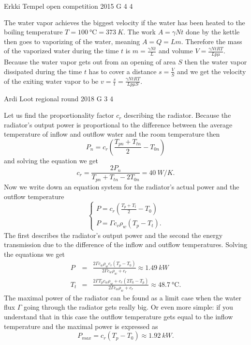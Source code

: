 \documentclass[11pt]{article}
\begin{document}
{Erkki Tempel} %
{open competition} %
{2015} %
{G 4} %
{4} %
{

\ifEngSolution
The water vapor achieves the biggest velocity if the water has been heated to the boiling temperature $T=\SI{100}{\celsius}=\SI{373}{K}$. The work $A=\gamma Nt$ done by the kettle then goes to vaporizing of the water, meaning $A=Q=Lm$. Therefore the mass of the vaporized water during the time $t$ is $m=\frac{\gamma Nt}{L}$ and volume $V=\frac{\gamma NtRT}{Lp\mu}$. Because the water vapor gets out from an opening of area $S$ then the water vapor dissipated during the time $t$ has to cover a distance $s=\frac{V}{S}$ and we get the velocity of the exiting water vapor to be $v=\frac{s}{t}=\frac{\gamma NtRT}{Lp\mu S}$.
\fi
}

{Ardi Loot} %
{regional round} %
{2018} %
{G 3} %
{4} %
{

\ifEngSolution
Let us find the proportionality factor $c_{r}$ describing the radiator. Because the radiator’s output power is proportional to the difference between the average temperature of inflow and outflow water and the room temperature then
\[
P_{n}=c_{r}\left(\frac{T_{pn}+T_{tn}}{2}-T_{0n}\right)
\]
and solving the equation we get
\[
c_{r}=\frac{2P_{n}}{T_{pn}+T_{tn}-2T_{0n}}=\SI{40}{W/K}.
\]
Now we write down an equation system for the radiator’s actual power and the outflow temperature
\[
\left\{ \begin{array}{c}
P=c_{r}\left(\frac{T_{p}+T_{t}}{2}-T_{0}\right)\\
P=\Gamma c_{v}\rho_{w}\left(T_{p}-T_{t}\right).
\end{array}\right.
\]
The first describes the radiator’s output power and the second the energy transmission due to the difference of the inflow and outflow temperatures. Solving the equations we get
\begin{eqnarray*}
P & = & \frac{2\Gamma c_{w}\rho_{w}c_{r}\left(T_{p}-T_{0}\right)}{2\Gamma c_{w}\rho_{w}+c_{r}}\approx\SI{1.49}{kW}\\
T_{t} & = & \frac{2\Gamma T_{p}c_{w}\rho_{w}+c_{r}\left(2T_{0}-T_{p}\right)}{2\Gamma c_{w}\rho_{w}+c_{r}}\approx\SI{48.7}{\celsius}.
\end{eqnarray*}
The maximal power of the radiator can be found as a limit case when the water flux $\Gamma$ going through the radiator gets really big. Or even more simple: if you understand that in this case the outflow temperature gets equal to the inflow temperature and the maximal power is expressed as 
\[
P_{max}=c_{r}\left(T_{p}-T_{0}\right)\approx\SI{1.92}{kW}.
\]
\fi
}
\end{document}
